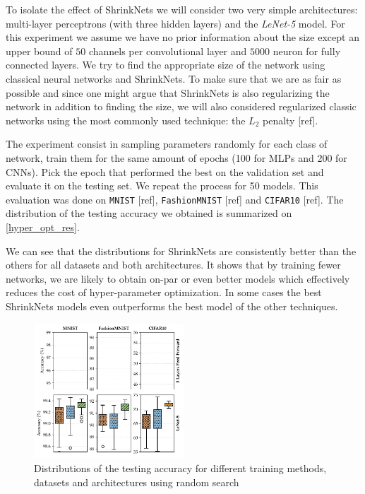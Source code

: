 \documentclass[sigconf]{acmart}
\begin{document}
\par To isolate the effect of ShrinkNets we will consider two very simple
architectures: multi-layer perceptrons (with three hidden layers) and the
\textit{LeNet-5} model. For this experiment we assume we have no prior
information about the size except an upper bound of $50$ channels per
convolutional layer and $5000$ neuron for fully connected layers.  We try to
find the appropriate size of the network using classical neural networks and
ShrinkNets. To make sure that we are as fair as possible and since one might
argue that ShrinkNets is also regularizing the network in addition to finding
the size, we will also considered regularized classic networks using the most
commonly used technique: the $L_2$ penalty [ref].
\par The experiment consist in sampling parameters randomly for each class of
network, train them for the same amount of epochs (100 for MLPs and 200 for CNNs). Pick the epoch that performed the best on the validation set and evaluate it
on the testing set. We repeat the process for 50 models. This evaluation was done
on \texttt{MNIST} [ref], \texttt{FashionMNIST} [ref] and \texttt{CIFAR10} [ref]. The distribution of the testing accuracy we obtained is summarized on \autoref{hyper_opt_res}.

We can see that the distributions for ShrinkNets are consistently better than the
others for all datasets and both architectures. It shows that by training fewer
networks, we are likely to obtain on-par or even better models which effectively
reduces the cost of hyper-parameter optimization. In some cases the best ShrinkNets
models even outperforms the best model of the other techniques.

\begin{figure}
\begin{center}
  \includegraphics[width=0.5\textwidth]{hyper_opt}
\caption{Distributions of the testing accuracy for different training methods, datasets and architectures using random search\label{hyper_opt_res}}
\end{center}
\end{figure}
\end{document}
